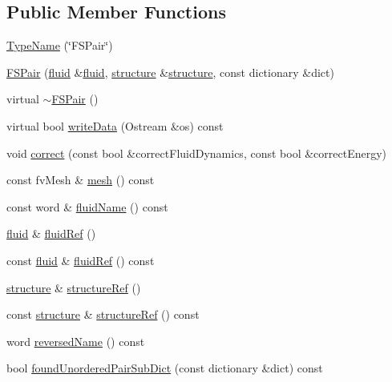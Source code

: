 \subsection*{Public Member Functions}
\begin{DoxyCompactItemize}
\item 
\hyperlink{classFoam_1_1FSPair_a4ec2cf197b0e6c24221654d8ccf1e9d4}{Type\+Name} (\char`\"{}F\+S\+Pair\char`\"{})
\item 
\hyperlink{classFoam_1_1FSPair_a641cfcbe9a70b9717a90dc5e19b65d62}{F\+S\+Pair} (\hyperlink{classFoam_1_1fluid}{fluid} \&\hyperlink{classFoam_1_1fluid}{fluid}, \hyperlink{classFoam_1_1structure}{structure} \&\hyperlink{classFoam_1_1structure}{structure}, const dictionary \&dict)
\item 
virtual \hyperlink{classFoam_1_1FSPair_a357436e69b38eb684d8eae4560cfe63d}{$\sim$\+F\+S\+Pair} ()
\item 
virtual bool \hyperlink{classFoam_1_1FSPair_a73ace448c639d2e1c943852abe89af7c}{write\+Data} (Ostream \&os) const
\item 
void \hyperlink{classFoam_1_1FSPair_ac892bd86a9a69984720308f911ec306f}{correct} (const bool \&correct\+Fluid\+Dynamics, const bool \&correct\+Energy)
\item 
const fv\+Mesh \& \hyperlink{classFoam_1_1FSPair_a470f06cfb9b6ee887cd85d63de275607}{mesh} () const
\item 
const word \& \hyperlink{classFoam_1_1FSPair_a75a39f8fe6a040c15873590b7c8a6458}{fluid\+Name} () const
\item 
\hyperlink{classFoam_1_1fluid}{fluid} \& \hyperlink{classFoam_1_1FSPair_a4b432181e8c6738177b85dbe209d6d83}{fluid\+Ref} ()
\item 
const \hyperlink{classFoam_1_1fluid}{fluid} \& \hyperlink{classFoam_1_1FSPair_ac95b3257d9aea860783bbbd3e4b79ace}{fluid\+Ref} () const
\item 
\hyperlink{classFoam_1_1structure}{structure} \& \hyperlink{classFoam_1_1FSPair_aa5041e12a8edbcdfa4effcbd1b793cfb}{structure\+Ref} ()
\item 
const \hyperlink{classFoam_1_1structure}{structure} \& \hyperlink{classFoam_1_1FSPair_a7f58c23adf92f0bebbb36df0479ee272}{structure\+Ref} () const
\item 
word \hyperlink{classFoam_1_1FSPair_af027c18dbb04da1eb58783b66faa7f5b}{reversed\+Name} () const
\item 
bool \hyperlink{classFoam_1_1FSPair_a01cfeb6abd47cb6594322646ef9e5d2b}{found\+Unordered\+Pair\+Sub\+Dict} (const dictionary \&dict) const
\item 

\end{DoxyCompactItemize}

